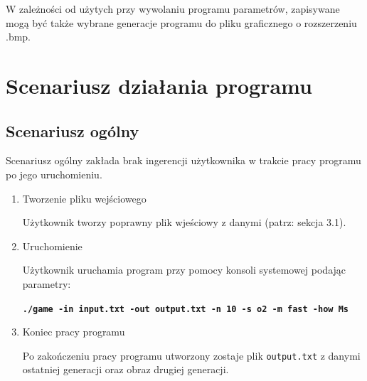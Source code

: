 \documentclass[a4paper]{article}
\begin{document}
W zale\.zno\'sci od u\.zytych przy wywolaniu programu parametr\'ow, zapisywane mog\k{a} by\'c tak\.ze wybrane generacje programu do pliku graficznego o rozszerzeniu .bmp.



\section{Scenariusz dzia\l{}ania programu}
\subsection{Scenariusz og\'olny}
\quad Scenariusz og\'olny zak\l{}ada brak ingerencji u\.zytkownika w trakcie pracy programu po jego uruchomieniu.
\begin{enumerate}
	\item Tworzenie pliku wej\'sciowego
	
		U\.zytkownik tworzy poprawny plik wje\'sciowy z danymi (patrz: sekcja 3.1).
	\item Uruchomienie
	
		U\.zytkownik uruchamia program przy pomocy konsoli systemowej podaj\k{a}c parametry:
	
	\begin{center}
		\texttt{\textbf{./game -in input.txt -out output.txt -n 10 -s o2 -m fast -how Ms}}
	\end{center}
	\item Koniec pracy programu
	
		Po zako\'nczeniu pracy programu utworzony zostaje plik \texttt{output.txt} z danymi ostatniej generacji oraz obraz drugiej generacji.
\end{enumerate}
\end{document}
